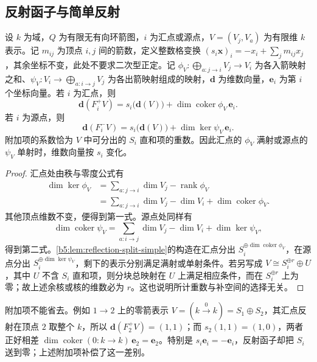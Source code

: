\subsection{反射函子与简单反射}
\label{b5:subsec:1002:03}

\begin{proposition}\label{b5:prop:reflection-dimension}
	设 \(k\) 为域，\(Q\) 为有限无有向环箭图，\(i\) 为汇点或源点，\(V=(V_j,V_a)\) 为有限维 \(k\) 表示。记 \(m_{ij}\) 为顶点 \(i,j\) 间的箭数，定义整数格变换 \((s_i\mathbf x)_i=-x_i+\sum_jm_{ij}x_j\)，其余坐标不变，此处不要求二次型正定。记 \(\phi_V:\bigoplus_{a:j\to i}V_j\to V_i\) 为各入箭映射之和、\(\psi_V:V_i\to\bigoplus_{a:i\to j}V_j\) 为各出箭映射组成的映射，\(\mathbf d\) 为维数向量，\(\mathbf e_i\) 为第 \(i\) 个坐标向量。若 \(i\) 为汇点，则
	\[
		\mathbf d(F_i^+V)=s_i\bigl(\mathbf d(V)\bigr) +\dim\operatorname{coker}\phi_V\,\mathbf e_i.
	\]
	若 \(i\) 为源点，则
	\[
		\mathbf d(F_i^-V)=s_i\bigl(\mathbf d(V)\bigr) +\dim\ker\psi_V\,\mathbf e_i.
	\]
	附加项的系数恰为 \(V\) 中可分出的 \(S_i\) 直和项的重数。因此汇点的 \(\phi_V\) 满射或源点的 \(\psi_V\) 单射时，维数向量按 \(s_i\) 变化。
\end{proposition}
\begin{proof}
	汇点处由秩与零度公式有
	\[
		\begin{aligned}
			\dim\ker\phi_V &=\sum_{a:j\to i}\dim V_j-\operatorname{rank}\phi_V\\
			&=\sum_{a:j\to i}\dim V_j-\dim V_i +\dim\operatorname{coker}\phi_V.
		\end{aligned}
	\]
	其他顶点维数不变，便得到第一式。源点处同样有
	\[
		\dim\operatorname{coker}\psi_V =\sum_{a:i\to j}\dim V_j-\dim V_i+\dim\ker\psi_V,
	\]
	得到第二式。\cref{b5:lem:reflection-split-simple}的构造在汇点分出 \(S_i^{\oplus\dim\operatorname{coker}\phi_V}\)，在源点分出 \(S_i^{\oplus\dim\ker\psi_V}\)，剩下的表示分别满足满射或单射条件。若另写成 \(V\cong S_i^{\oplus r}\oplus U\)，其中 \(U\) 不含 \(S_i\) 直和项，则分块总映射在 \(U\) 上满足相应条件，而在 \(S_i^{\oplus r}\) 上为零；故上述余核或核的维数必为 \(r\)。这也说明所计重数与补空间的选择无关。
\end{proof}

附加项不能省去。例如 \(1\to2\) 上的零箭表示 \(V=(k\xrightarrow{0}k)=S_1\oplus S_2\)，其汇点反射在顶点 \(2\) 取整个 \(k\)，所以 \(\mathbf d(F_2^+V)=(1,1)\)；而 \(s_2(1,1)=(1,0)\)，两者正好相差 \(\dim\operatorname{coker}(0:k\to k)\,\mathbf e_2=\mathbf e_2\)。特别是 \(s_i\mathbf e_i=-\mathbf e_i\)，反射函子却把 \(S_i\) 送到零；上述附加项补偿了这一差别。

